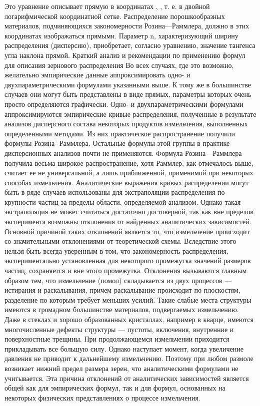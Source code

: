 Это уравнение описывает прямую в координатах  ,  , т. е. в двойной логарифмической координатной сетке.
Распределение порошкообразных материалов, подчиняющихся закономерности Розина—Раммлера, должно в этих координатах изображаться прямыми. Параметр n, характеризующий ширину распределения (дисперсию), приобретает, согласно уравнению, значение тангенса угла наклона прямой. 
Краткий анализ и рекомендации по применению формул для описания зернового распределения 
Во всех случаях, где это возможно, желательно эмпирические данные аппроксимировать одно- и двухпараметрическими формулами указанными выше. К тому же в большинстве случаев они могут быть представлены в виде прямых, параметры которых очень просто определяются графически.
Одно- и двухпараметрическими формулами аппроксимируются эмпирические кривые распределения, полученные в результате анализов дисперсного состава некоторых продуктов измельчения, выполненных определенными методами. Из них практическое распространение получили формулы Розина- Раммлера. Остальные формулы этой группы в практике дисперсионных анализов почти не применяются. 
Формула Розина—Раммлера получила весьма широкое распространение, хотя Раммлер, как отмечалось выше, считает ее не универсальной, а лишь приближенной, применимой при некоторых способах измельчения. 
Аналитические выражения кривых распределении могут быть в ряде случаев использованы для экстраполяции распределения по крупности частиц за пределы области, определяемой анализом. Однако такая экстраполяция не может считаться достаточно достоверной, так как вне пределов эксперимента возможны отклонения от найденных аналитических зависимостей. Основной причиной таких отклонений является то, что измельчение происходит со значительными отклонениями от теоретической схемы. Вследствие этого нельзя быть всегда уверенным в том, что закономерность распределения, экспериментально установленная для некоторого промежутка значений размеров частиц, сохраняется и вне этого промежутка. Отклонения вызываются главным образом тем, что измельчение (помол) складывается из двух процессов — истирания и  раскалывания, причем раскалывание происходит по плоскостям, разделение по которым требует меньших усилий. Такие слабые места структуры имеются в громадном большинстве материалов, подвергаемых измельчению. Даже в стеклах и хорошо образованных кристаллах, например в кварце, имеются многочисленные дефекты структуры — пустоты, включения, внутренние и поверхностные трещины. При продолжающемся измельчении приходится прикладывать все большую силу. Однако наступает момент, когда увеличение давления не приводит к дальнейшему измельчению. Поэтому при любом размоле возникает нижний предел размера зерен, что аналитическими формулами не учитывается. Эта причина отклонений от аналитических зависимостей является общей как для эмпирических формул, так и для формул, основанных на некоторых физических представлениях о процессе измельчения. 

